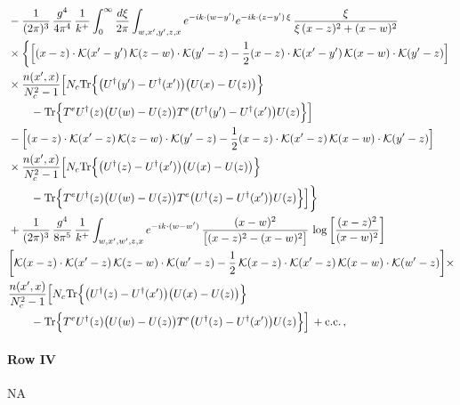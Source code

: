 \documentclass[9pt]{article}
\numberwithin{equation}{section}
\begin{document}
\begin{align}
&-\frac{1}{(2\pi)^{3}}\,\frac{g^{4}}{4\pi^{4}}\,\frac{1}{k^{+}}\int_{0}^{\infty}\frac{d\xi}{2\pi}\int_{w,x',y',z,x}e^{-ik\cdot(w-y')}e^{-ik\cdot(z-y')\,\xi}\,\frac{\xi}{\xi\,(x-z)^{2}+(x-w)^{2}}\notag\\
&\times\bigg\{\Big[(x-z)\cdot\mathcal{K}(x'-y')\,\mathcal{K}(z-w)\cdot\mathcal{K}(y'-z)-\frac{1}{2}(x-z)\cdot\mathcal{K}(x'-y')\,\mathcal{K}(x-w)\cdot\mathcal{K}(y'-z)\Big]\notag\\
&\times\frac{n(x',x)}{N_{c}^{2}-1}\Big[N_{c}{\rm Tr}\Big\{\big(U^{\dagger}(y')-U^{\dagger}(x')\big)\big(U(x)-U(z)\big)\Big\}\notag\\&\qquad-{\rm Tr}\Big\{T^{e}U^{\dagger}(z)\big(U(w)-U(z)\big)T^{e}\big(U^{\dagger}(y')-U^{\dagger}(x')\big)U(z)\Big\}\Big]\notag\\
&-\Big[(x-z)\cdot\mathcal{K}(x'-z)\,\mathcal{K}(z-w)\cdot\mathcal{K}(y'-z)-\frac{1}{2}(x-z)\cdot\mathcal{K}(x'-z)\,\mathcal{K}(x-w)\cdot\mathcal{K}(y'-z)\Big]\notag\\
&\times\frac{n(x',x)}{N_{c}^{2}-1}\Big[N_{c}{\rm Tr}\Big\{\big(U^{\dagger}(z)-U^{\dagger}(x')\big)\big(U(x)-U(z)\big)\Big\}\notag\\&\qquad-{\rm Tr}\Big\{T^{e}U^{\dagger}(z)\big(U(w)-U(z)\big)T^{e}\big(U^{\dagger}(z)-U^{\dagger}(x')\big)U(z)\Big\}\Big]\bigg\}\notag\\
& +\frac{1}{(2\pi)^{3}}\,\frac{g^{4}}{8\pi^{5}}\,\frac{1}{k^{+}}\int_{w,x',w',z,x}e^{-ik\cdot(w-w')}\,\frac{(x-w)^{2}}{\big[(x-z)^{2}-(x-w)^{2}\big]}\,\log\left[\frac{(x-z)^{2}}{(x-w)^{2}}\right]\notag \\ &  \bigg[\mathcal{K}(x-z)\cdot\mathcal{K}(x'-z)\,\mathcal{K}(z-w)\cdot\mathcal{K}(w'-z)-\frac{1}{2}\,\mathcal{K}(x-z)\cdot\mathcal{K}(x'-z)\,\mathcal{K}(x-w)\cdot\mathcal{K}(w'-z)\bigg]   \times\notag \\ & \frac{n(x',x)}{N_{c}^{2}-1}\Big[N_{c}{\rm Tr}\Big\{\big(U^{\dagger}(z)-U^{\dagger}(x')\big)\big(U(x)-U(z)\big)\Big\}\notag\\&\qquad-{\rm Tr}\Big\{T^{e}U^{\dagger}(z)\big(U(w)-U(z)\big)T^{e}\big(U^{\dagger}(z)-U^{\dagger}(x')\big)U(z)\Big\}\Big]\,+{\rm c.c.}\,,\label{eq:S-III.III-2o}
\end{align}
\paragraph*{Row IV}
\textsc{NA}
\end{document}
